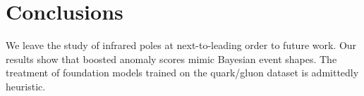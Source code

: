 \section{Conclusions}\label{sec:conclusions}

We leave the study of infrared poles at next-to-leading order to future
work. Our results show that boosted anomaly scores mimic Bayesian event
shapes. The treatment of foundation models trained on the quark/gluon
dataset is admittedly heuristic.

